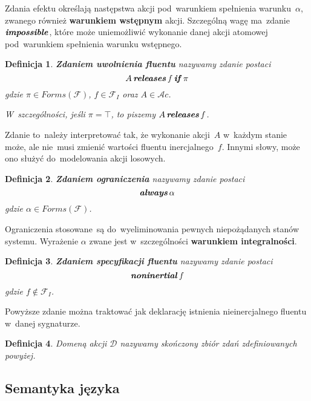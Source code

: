 \documentclass[11pt,a4paper]{article}
\newtheorem{defn}{Definicja}
\DeclareMathOperator{\If}{\textbf{\textit{if}}}
\DeclareMathOperator{\Impossible}{\textbf{\textit{impossible}}}
\DeclareMathOperator{\Releases}{\textbf{\textit{releases}}}
\DeclareMathOperator{\Always}{\textbf{\textit{always}}}
\DeclareMathOperator{\Noninertial}{\textbf{\textit{noninertial}}}
\begin{document}
Zdania efektu określają następstwa akcji pod~warunkiem spełnienia warunku~$\alpha$, zwanego również \textbf{warunkiem wstępnym} akcji.
Szczególną wagę ma~zdanie $\Impossible$, które może uniemożliwić wykonanie danej akcji atomowej pod~warunkiem spełnienia warunku wstępnego.

\begin{defn}
    \textbf{Zdaniem uwolnienia fluentu} nazywamy zdanie postaci
    $$ A \Releases f \If \pi $$
    gdzie $\pi \in Forms(\mathcal{F})$, $f \in \mathcal{F}_I$ oraz $A \in \mathcal{A}c$.

    W~szczególności, jeśli $\pi = \top$, to piszemy $A \Releases f$.
\end{defn}

Zdanie to~należy interpretować tak, że wykonanie akcji~$A$ w~każdym stanie może, ale nie~musi zmienić wartości fluentu inercjalnego~$f$.
Innymi słowy, może ono służyć do~modelowania akcji losowych.

\begin{defn}
    \textbf{Zdaniem ograniczenia} nazywamy zdanie postaci
    $$ \Always \alpha $$
    gdzie $\alpha \in Forms(\mathcal{F})$.
\end{defn}

Ograniczenia stosowane~są do~wyeliminowania pewnych niepożądanych stanów systemu.
Wyrażenie $\alpha$ zwane jest w~szczególności \textbf{warunkiem integralności}.

\begin{defn}
    \textbf{Zdaniem specyfikacji fluentu} nazywamy zdanie postaci
    $$ \Noninertial f $$
    gdzie $f \notin \mathcal{F}_I$. 
\end{defn}

Powyższe zdanie można traktować jak deklarację istnienia nieinercjalnego fluentu w~danej sygnaturze.

\begin{defn}
    Domeną akcji $\mathcal{D}$ nazywamy skończony zbiór zdań zdefiniowanych powyżej.
\end{defn}

\subsection{Semantyka języka}
\end{document}
